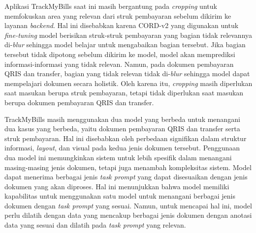 Aplikasi TrackMyBills saat ini masih bergantung pada \emph{cropping} untuk memfokuskan area yang relevan dari struk pembayaran sebelum dikirim ke layanan \emph{backend}. Hal ini disebabkan karena \dataset{} CORD-v2 yang digunakan untuk \emph{fine-tuning} model \donut{} berisikan struk-struk pembayaran yang bagian tidak relevannya di-\emph{blur} sehingga model belajar untuk mengabaikan bagian tersebut. Jika bagian tersebut tidak dipotong sebelum dikirim ke model, model akan memprediksi informasi-informasi yang tidak relevan. Namun, pada dokumen pembayaran QRIS dan transfer, bagian yang tidak relevan tidak di-\emph{blur} sehingga model \donut{} dapat mempelajari dokumen secara holistik. Oleh karena itu, \emph{cropping} masih diperlukan saat masukan berupa struk pembayaran, tetapi tidak diperlukan saat masukan berupa dokumen pembayaran QRIS dan transfer.

TrackMyBills masih menggunakan dua model yang berbeda untuk menangani dua kasus yang berbeda, yaitu dokumen pembayaran QRIS dan transfer serta struk pembayaran. Hal ini disebabkan oleh perbedaan signifikan dalam struktur informasi, \emph{layout}, dan visual pada kedua jenis dokumen tersebut. Penggunaan dua model ini memungkinkan sistem untuk lebih spesifik dalam menangani masing-masing jenis dokumen, tetapi juga menambah kompleksitas sistem. Model \donut{} dapat menerima berbagai jenis \emph{task prompt} yang dapat disesuaikan dengan jenis dokumen yang akan diproses. Hal ini menunjukkan bahwa model \donut{} memiliki kapabilitas untuk menggunakan satu model untuk menangani berbagai jenis dokumen dengan \emph{task prompt} yang sesuai. Namun, untuk mencapai hal ini, model perlu dilatih dengan data yang mencakup berbagai jenis dokumen dengan anotasi data yang sesuai dan dilatih pada \emph{task prompt} yang relevan.